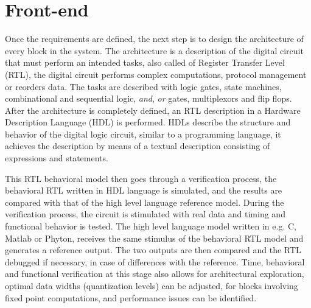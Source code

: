 \section{Front-end}

Once the requirements are defined, the next step is to design the architecture of every block in the system. The architecture is a description of the digital circuit that must perform an intended tasks, also called of Register Transfer Level (RTL), the  digital circuit performs complex computations, protocol management or reorders data. The tasks are described with logic gates, state machines, combinational and sequential logic, \emph{and}, \emph{or} gates, multiplexors and flip flops. After the architecture is completely defined, an RTL description in a Hardware Description Language (HDL) is performed. HDLs describe the structure and behavior of the digital logic circuit, similar to a programming language, it achieves the description by means of a textual description consisting of expressions and statements. 

This RTL behavioral model then goes through a verification process, the behavioral RTL written in HDL language is simulated, and the results are compared with that of the high level language reference model. During the verification process, the circuit is stimulated with real data and timing and functional behavior is tested. The high level language model written in e.g. C, Matlab or Phyton, receives the same stimulus of the behavioral RTL model and generates a reference output. The two outputs are then compared and the RTL debugged if necessary, in case of differences with the reference. Time, behavioral and functional verification at this stage also allows for architectural exploration, optimal data widths (quantization levels) can be adjusted, for blocks involving fixed point computations, and performance issues can be identified.


